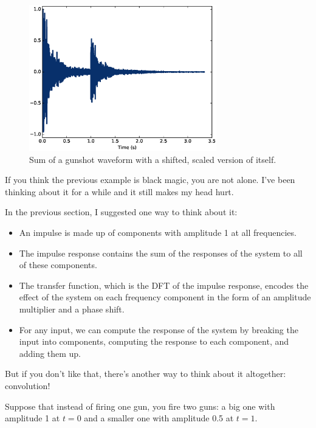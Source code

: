 \documentclass[12pt]{book}
\begin{document}
\begin{figure}
\centerline{\includegraphics[height=2.5in]{figs/systems8.eps}}
\caption{Sum of a gunshot waveform with a shifted, scaled version of
itself.}
\label{fig.systems8}
\end{figure}

If you think the previous example is black magic,
you are not alone.  I've been thinking about it for a while and it
still makes my head hurt.

In the previous section, I suggested one way to think about it:

\begin{itemize}

\item An impulse is made up of components with amplitude 1 at all
  frequencies.

\item The impulse response contains the sum of the responses of the
  system to all of these components.

\item The transfer function, which is the DFT of the impulse response,
  encodes the effect of the system on each frequency component in the form
  of an amplitude multiplier and a phase shift.

\item For any input, we can compute the response of the system
  by breaking the input into components, computing the response to
  each component, and adding them up.

\end{itemize}

But if you don't like that, there's another way to think about
it altogether: convolution!

Suppose that instead of firing one gun, you fire two guns:
a big one with amplitude 1 at $t=0$ and a smaller one with
amplitude 0.5 at $t=1$.
\end{document}
